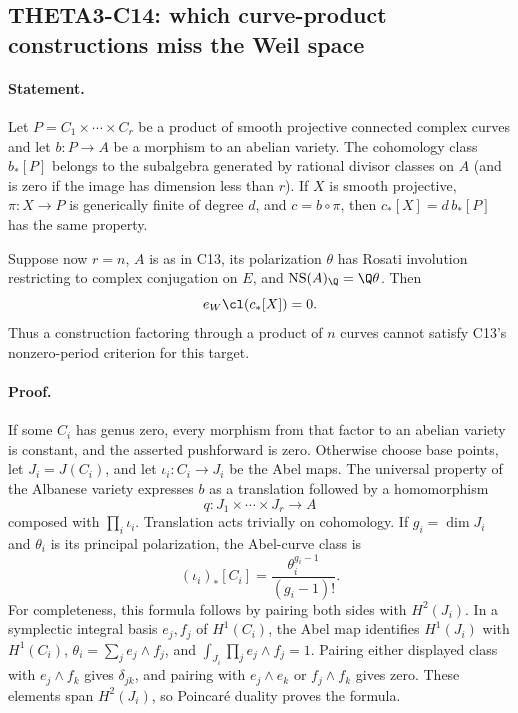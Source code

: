 \subsection{THETA3-C14: which curve-product constructions miss the Weil space}\label{C14}

\paragraph{Statement.}
Let $P=C_1\times\cdots\times C_r$ be a product of smooth projective
connected complex curves and let $b:P\to A$ be a morphism to an abelian
variety. The cohomology class $b_*[P]$ belongs to the subalgebra
generated by rational divisor classes on $A$ (and is zero if the
image has dimension less than $r$). If $X$ is smooth projective,
$\pi:X\to P$ is generically finite of degree $d$, and $c=b\circ\pi$, then
$c_*[X]=d\,b_*[P]$ has the same property.

Suppose now $r=n$, $A$ is as in C13, its polarization $\theta$ has
Rosati involution restricting to complex conjugation on $E$, and
$\operatorname{NS}(A)_\Q=\Q\theta$. Then
\[
 e_W\cl(c_*[X])=0.
\]
Thus a construction factoring through a product of $n$ curves cannot
satisfy C13's nonzero-period criterion for this target.

\paragraph{Proof.}
If some $C_i$ has genus zero, every morphism from that factor to an
abelian variety is constant, and the asserted pushforward is zero.
Otherwise choose base points, let $J_i=J(C_i)$, and let
$\iota_i:C_i\to J_i$ be the Abel maps. The universal property of
the Albanese variety expresses $b$ as a translation followed by a
homomorphism
\[
 q:J_1\times\cdots\times J_r\longrightarrow A
\]
composed with $\prod_i\iota_i$. Translation acts trivially on
cohomology. If $g_i=\dim J_i$ and $\theta_i$ is its principal
polarization, the Abel-curve class is
\[
 (\iota_i)_*[C_i]=\frac{\theta_i^{g_i-1}}{(g_i-1)!}.
\]
For completeness, this formula follows by pairing both sides with
$H^2(J_i)$. In a symplectic integral basis $e_j,f_j$ of $H^1(C_i)$,
the Abel map identifies $H^1(J_i)$ with $H^1(C_i)$,
$\theta_i=\sum_j e_j\wedge f_j$, and
$\int_{J_i}\prod_j e_j\wedge f_j=1$. Pairing either displayed class
with $e_j\wedge f_k$ gives $\delta_{jk}$, and pairing with
$e_j\wedge e_k$ or $f_j\wedge f_k$ gives zero. These elements span
$H^2(J_i)$, so Poincar\'e duality proves the formula.

